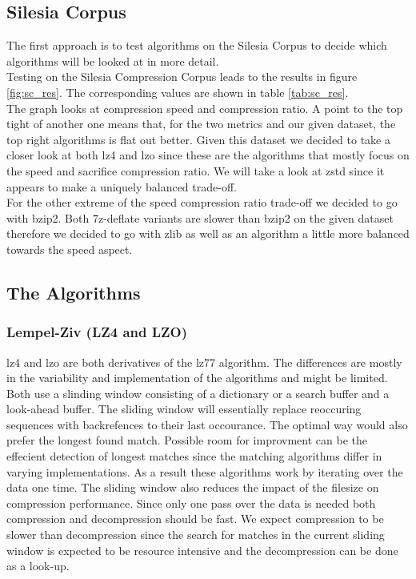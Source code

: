 \documentclass[
	12pt,
	a4paper,
	BCOR10mm,
	DIV14,
	listof=totoc,
	bibliography=totoc,
	headsepline
]{scrreprt}
\begin{document}
\subsection{Silesia Corpus}
The first approach is to test algorithms on the Silesia Corpus to decide which algorithms will be looked at in more detail.
\\
Testing on the Silesia Compression Corpus leads to the results in figure \ref{fig:sc_res}.
The corresponding values are shown in table \ref{tab:sc_res}. \\






The graph looks at compression speed and compression ratio. A point to the top tight of another one means that, for the two metrics and our given dataset, the top right algorithms is flat out better. Given this dataset we decided to take a closer look at both lz4 and lzo since these are the algorithms that mostly focus on the speed and sacrifice compression ratio. We will take a look at zstd since it appears to make a uniquely balanced trade-off. \\
For the other extreme of the speed compression ratio trade-off we decided to go with bzip2. Both 7z-deflate variants are slower than bzip2 on the given dataset therefore we decided to go with zlib as well as an algorithm a little more balanced towards the speed aspect.



\subsection{The Algorithms}
\label{algorithms}
\subsubsection{Lempel-Ziv (LZ4 and LZO)}
lz4 and lzo are both derivatives of the lz77 algorithm. The differences are mostly in the variability and implementation of the algorithms and might be limited.
Both use a slinding window consisting of a dictionary or a search buffer and a look-ahead buffer. 
The sliding window will essentially replace reoccuring sequences with backrefences to their last occourance.
The optimal way would also prefer the longest found match.
 Possible room for improvment can be the effecient detection of longest matches since the matching algorithms differ in varying implementations.
As a result these algorithms work by iterating over the data one time. 
The sliding window also reduces the impact of the filesize on compression performance.
Since only one pass over the data is needed both compression and decompression should be fast. 
We expect compression to be slower than decompression since the search for matches in the current sliding window is expected to be resource intensive and the decompression can be done as a look-up.
\end{document}

